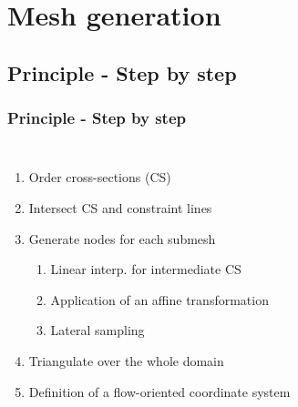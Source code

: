 \documentclass[10pt]{beamer}
\begin{document}
\section{Mesh generation}

\subsection{Principle - Step by step}
\begin{frame}\frametitle{Principle - Step by step}

  \begin{columns}[T,]
      \begin{enumerate}
        \item<1-> Order cross-sections (CS)
        \item<2-> Intersect CS and constraint lines
        \item<3-> Generate nodes for each submesh
        \begin{enumerate}
            \item<4-> Linear interp. for intermediate CS
            \item<5-> Application of an affine transformation
            \item<6-> Lateral sampling
        \end{enumerate}
        \item<7-> Triangulate over the whole domain
        \item<8-> Definition of a flow-oriented coordinate system
      \end{enumerate}


\end{columns}
\end{frame}
\end{document}
